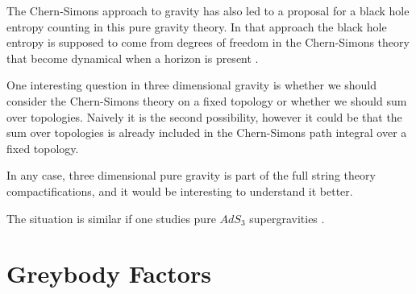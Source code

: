 The Chern-Simons approach to gravity has also led to a proposal
for a black hole entropy counting in this pure gravity theory. 
In that approach the black hole entropy is supposed to come
from degrees of freedom in the Chern-Simons theory that become
dynamical when  a horizon is present  \cite{Carlip:1995qv}. 

One interesting question in three dimensional gravity is 
whether we should consider the Chern-Simons theory on a fixed 
topology or whether we should sum over topologies. Naively it
is the second possibility, however it could be that the sum 
over topologies is already included in the Chern-Simons
path integral over a fixed topology. 

In any case, three dimensional pure gravity is part of the 
full string theory compactifications, and it would be interesting
to understand it better. 

The situation is similar if one studies pure $AdS_3$ supergravities 
\cite{Achucarro:1989gm,Banados:1998pi,David:1999nr}.




\section{Greybody Factors}
\label{adsthree_greybody}

